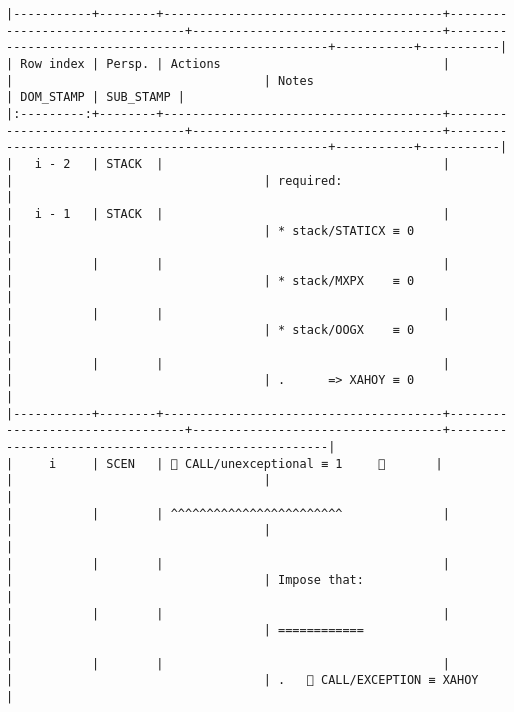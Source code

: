 \documentclass[varwidth=\maxdimen,margin=0.5cm,multi={verbatim}]{standalone}
\begin{document}
\begin{verbatim}
|-----------+--------+---------------------------------------+---------------------------------+-----------------------------------+-----------------------------------------------------+-----------+-----------|
| Row index | Persp. | Actions                               |                                 |                                   | Notes                                               | DOM_STAMP | SUB_STAMP |
|:---------:+--------+---------------------------------------+---------------------------------+-----------------------------------+-----------------------------------------------------+-----------+-----------|
|   i - 2   | STACK  |                                       |                                 |                                   | required:                                           |
|   i - 1   | STACK  |                                       |                                 |                                   | * stack/STATICX ≡ 0                                 |
|           |        |                                       |                                 |                                   | * stack/MXPX    ≡ 0                                 |
|           |        |                                       |                                 |                                   | * stack/OOGX    ≡ 0                                 |
|           |        |                                       |                                 |                                   | .      => XAHOY ≡ 0                                 |
|-----------+--------+---------------------------------------+---------------------------------+-----------------------------------+-----------------------------------------------------|
|     i     | SCEN   |  CALL/unexceptional ≡ 1     👋       |                                 |                                   |                                                     |
|           |        | ^^^^^^^^^^^^^^^^^^^^^^^^              |                                 |                                   |                                                     |
|           |        |                                       |                                 |                                   | Impose that:                                        |
|           |        |                                       |                                 |                                   | ============                                        |
|           |        |                                       |                                 |                                   | .    CALL/EXCEPTION ≡ XAHOY                        |

\end{verbatim}
\end{document}

